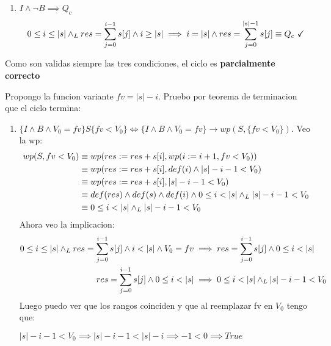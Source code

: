 \documentclass{article}
\begin{document}
\begin{itemize}
{\begin{enumerate}
\begin{align}
            &\equiv \enRango{i}{s}\land_L res=\sum\limits_{j=0}^{i-1}s[j]
        \end{align}
        Luego como $\{I\land B\}\equiv wp(S,I)$ por tautologia la implicaion es valida
        \item $I\land \neg B \implies Q_c$
        \cont\begin{align}
            0\leq i \leq|s|\land_L res=\sum\limits_{j=0}^{i-1}s[j] \land i\geq|s| \implies i=|s| \land res=\sum\limits_{j=0}^{|s|-1}s[j] \equiv Q_c \ \checkmark
        \end{align}
    \end{enumerate}
    Como son validas siempre las tres condiciones, el ciclo es \textbf{parcialmente correcto}

    \item [f) ] Propongo la funcion variante $fv=|s|-i$. Pruebo por teorema de terminacion que el ciclo termina:\\
    \begin{enumerate}
        \item $\{I\land B\land V_0=fv\}S\{fv<V_0\}\Longleftrightarrow \{I\land B\land V_0=fv\}\to wp(S,\{fv<V_0\})$. Veo la wp:\\
        \cont\begin{align}
            wp(S,fv<V_0)&\equiv wp(res:=res+s[i],wp(i:=i+1,fv<V_0))\\
            &\equiv wp(res:=res+s[i],def(i)\land |s|-i-1<V_0)\\
            &\equiv wp(res:=res+s[i],|s|-i-1<V_0)\\
            &\equiv def(res)\land def(s)\land def(i)\land \enRango{i}{s}\land_L |s|-i-1<V_0\\
            &\equiv \enRango{i}{s}\land_L |s|-i-1<V_0\\
        \end{align}
        Ahora veo la implicacion:
        \cont\begin{align}
            \enRangoInc{i}{s} \land_L res=\sum\limits_{j=0}^{i-1}s[j] \land i<|s| \land V_0=fv &\implies res=\sum\limits_{j=0}^{i-1}s[j] \land \enRango{i}{s}\\
            res=\sum\limits_{j=0}^{i-1}s[j] \land \enRango{i}{s} &\implies \enRango{i}{s}\land_L |s|-i-1<V_0
        \end{align}
        Luego puedo ver que los rangos coinciden y que al reemplazar fv en $V_0$ tengo que:\\
        \begin{center}$|s|-i-1<V_0\implies |s|-i-1<|s|-i\implies -1<0\implies True$\end{center}


\end{enumerate}}
\end{itemize}
\end{document}
